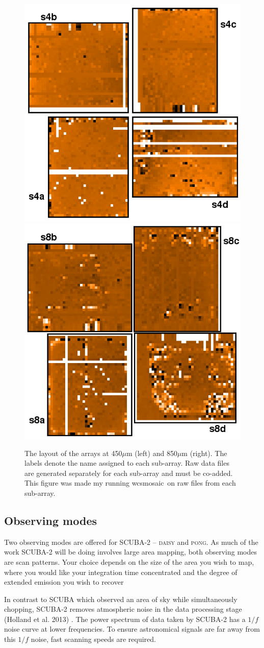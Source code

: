 \documentclass[twoside,11pt]{article}
\newcommand{\xref}[3]{#1}
\newcommand{\xlabel}[1]{}
\renewcommand{\_}{\texttt{\symbol{95}}}
\newcommand{\task}[1]{\textsf{#1}}
\newcommand{\wcsmosaic}{\xref{\task{wcsmosaic}}{sun95}{WCSMOSAIC}}
\begin{document}
\begin{figure}[t!]
\begin{center}
\includegraphics[width=0.4\linewidth]{sc21_450array}
\hspace{1cm}
\includegraphics[width=0.4\linewidth]{sc21_850array}
\label{fig:arrays}
\caption{\small The layout of the arrays at 450$\mu$m (left) and
850$\mu$m (right). The labels denote the name assigned to each
sub-array. Raw data files are generated separately for each sub-array
and must be co-added. This figure was made my running \wcsmosaic\ on
raw files from each sub-array.}
\end{center}
\end{figure}

\subsection{\xlabel{obs_modes}Observing modes}
\label{sec:mmodes}

Two observing modes are offered for SCUBA-2 -- \textsc{daisy} and
\textsc{pong}. As much of the work SCUBA-2 will be doing involves
large area mapping, both observing modes are scan patterns. Your
choice depends on the size of the area you wish to map, where you
would like your integration time concentrated and the degree of
extended emission you wish to recover

In contrast to SCUBA which observed an area of sky while
simultaneously chopping, SCUBA-2 removes atmospheric noise in the data
processing stage (Holland et al. 2013) \cite{s2main}. The power spectrum
of data taken by SCUBA-2 has a $1/f$ noise curve at lower frequencies. To
ensure astronomical signals are far away from this $1/f$ noise, fast
scanning speeds are required.
\end{document}
